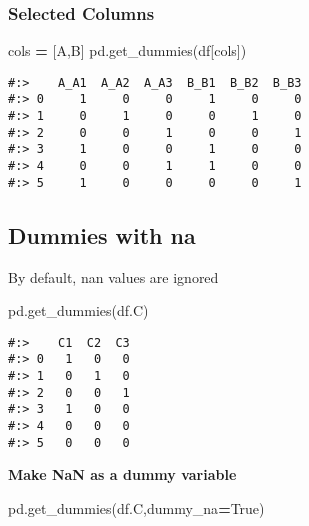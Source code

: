 \documentclass[
]{book}
\newenvironment{Shaded}{\begin{snugshade}}{\end{snugshade}}
\newcommand{\NormalTok}[1]{#1}
\newcommand{\OperatorTok}[1]{\textcolor[rgb]{0.43,0.43,0.43}{\textbf{#1}}}
\newcommand{\StringTok}[1]{\textcolor[rgb]{0.5,0.5,0.5}{#1}}
\newcommand{\VariableTok}[1]{\textcolor[rgb]{0,0,0}{#1}}
\begin{document}
\hypertarget{selected-columns}{%
\subsubsection{Selected Columns}\label{selected-columns}}

\begin{Shaded}
\begin{Highlighting}[]
\NormalTok{cols }\OperatorTok{=}\NormalTok{ [}\StringTok{\textquotesingle{}A\textquotesingle{}}\NormalTok{,}\StringTok{\textquotesingle{}B\textquotesingle{}}\NormalTok{]}
\NormalTok{pd.get\_dummies(df[cols])}
\end{Highlighting}
\end{Shaded}

\begin{verbatim}
#:>    A_A1  A_A2  A_A3  B_B1  B_B2  B_B3
#:> 0     1     0     0     1     0     0
#:> 1     0     1     0     0     1     0
#:> 2     0     0     1     0     0     1
#:> 3     1     0     0     1     0     0
#:> 4     0     0     1     1     0     0
#:> 5     1     0     0     0     0     1
\end{verbatim}

\hypertarget{dummies-with-na}{%
\subsection{Dummies with na}\label{dummies-with-na}}

By default, nan values are ignored

\begin{Shaded}
\begin{Highlighting}[]
\NormalTok{pd.get\_dummies(df.C)}
\end{Highlighting}
\end{Shaded}

\begin{verbatim}
#:>    C1  C2  C3
#:> 0   1   0   0
#:> 1   0   1   0
#:> 2   0   0   1
#:> 3   1   0   0
#:> 4   0   0   0
#:> 5   0   0   0
\end{verbatim}

\textbf{Make NaN as a dummy variable}

\begin{Shaded}
\begin{Highlighting}[]
\NormalTok{pd.get\_dummies(df.C,dummy\_na}\OperatorTok{=}\VariableTok{True}\NormalTok{)}
\end{Highlighting}
\end{Shaded}
\end{document}
